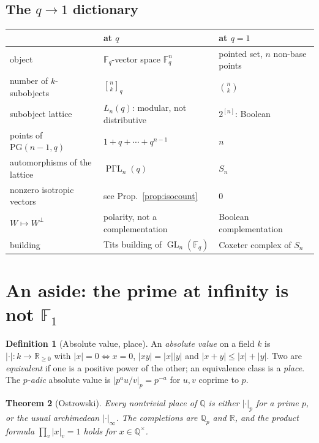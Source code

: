 \documentclass[11pt,a4paper]{article}
\newtheorem{theorem}{Theorem}[section]
\theoremstyle{definition}
\newtheorem{definition}[theorem]{Definition}
\theoremstyle{remark}
\newcommand{\FF}{\mathbb{F}}
\newcommand{\RR}{\mathbb{R}}
\newcommand{\QQ}{\mathbb{Q}}
\newcommand{\perpp}{^{\perp}}
\newcommand{\PG}{\mathrm{PG}}
\DeclareMathOperator{\PGammaL}{P\Gamma L}
\DeclareMathOperator{\GL}{GL}
\newcommand{\qbin}[2]{\genfrac{[}{]}{0pt}{}{#1}{#2}_{q}}
\begin{document}
\subsection*{The $q \to 1$ dictionary}

\begin{center}
\small
\setlength{\tabcolsep}{4pt}
\begin{tabular}{lll}
\toprule
& at $q$ & at $q = 1$ \\
\midrule
object & $\FF_q$-vector space $\FF_q^{n}$ & pointed set, $n$ non-base points \\
number of $k$-subobjects & $\qbin{n}{k}$ & $\binom{n}{k}$ \\
subobject lattice & $L_n(q)$: modular, not distributive & $2^{[n]}$: Boolean \\
points of $\PG(n{-}1,q)$ & $1 + q + \cdots + q^{n-1}$ & $n$ \\
automorphisms of the lattice & $\PGammaL_n(q)$ & $S_n$ \\
nonzero isotropic vectors & see Prop.~\ref{prop:isocount} & $0$ \\
$W \mapsto W\perpp$ & polarity, not a complementation & Boolean complementation \\
building & Tits building of $\GL_n(\FF_q)$ & Coxeter complex of $S_n$ \\
\bottomrule
\end{tabular}
\end{center}

\section{An aside: the prime at infinity is not $\FF_1$}

\begin{definition}[Absolute value, place]
An \emph{absolute value} on a field $k$ is $|\cdot| : k \to \RR_{\geq 0}$ with $|x| = 0 \iff
x = 0$, $|xy| = |x||y|$ and $|x+y| \leq |x| + |y|$. Two are \emph{equivalent} if one is a
positive power of the other; an equivalence class is a \emph{place}. The \emph{$p$-adic}
absolute value is $|p^{a} u/v|_p = p^{-a}$ for $u,v$ coprime to $p$.
\end{definition}

\begin{theorem}[Ostrowski]
Every nontrivial place of $\QQ$ is either $|\cdot|_p$ for a prime $p$, or the usual
archimedean $|\cdot|_{\infty}$. The completions are $\QQ_p$ and $\RR$, and the product formula
$\prod_{v} |x|_v = 1$ holds for $x \in \QQ^{\times}$.
\end{theorem}
\end{document}
